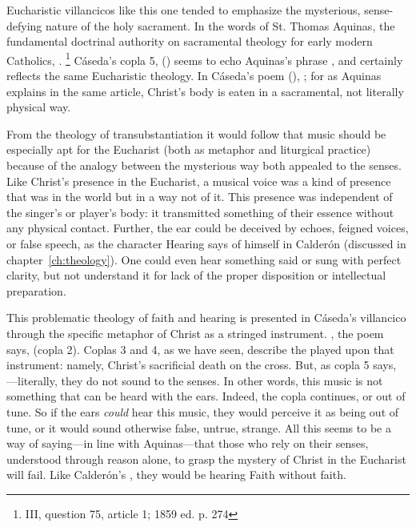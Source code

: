 Eucharistic villancicos like this one tended to emphasize the mysterious, sense-defying nature of the holy sacrament. 
In the words of St. Thomas Aquinas, the fundamental doctrinal authority on sacramental theology for early modern Catholics, .%
	\footnote{ III, question 75, article 1; 1859 ed. p. 274}
Cáseda's copla 5,  () seems to echo Aquinas's phrase , and certainly reflects the same Eucharistic theology.
In Cáseda's poem (), ; for as Aquinas explains in the same article, Christ's body is eaten in a sacramental, not literally physical way.

From the theology of transubstantiation it would follow that music should be especially apt for the Eucharist (both as metaphor and liturgical practice) because of the analogy between the mysterious way both appealed to the senses.
Like Christ's presence in the Eucharist, a musical voice was a kind of presence that was in the world but in a way not of it. 
This presence was independent of the singer's or player's body: it transmitted something of their essence without any physical contact.
Further, the ear could be deceived by echoes, feigned voices, or false speech, as the character Hearing says of himself in Calderón  (discussed in chapter~\ref{ch:theology}).
One could even hear something said or sung with perfect clarity, but not understand it for lack of the proper disposition or intellectual preparation.

This problematic theology of faith and hearing is presented in Cáseda's villancico through the specific metaphor of Christ as a stringed instrument.
, the poem says,  (copla 2).
Coplas 3 and 4, as we have seen, describe the  played upon that instrument: namely, Christ's sacrificial death on the cross.
But, as copla 5 says, ---literally, they do not sound to the senses. 
In other words, this music is not something that can be heard with the ears.
Indeed, the copla continues,  or out of tune.
So if the ears \emph{could} hear this music, they would perceive it as being out of tune, or it would sound otherwise false, untrue, strange. 
All this seems to be a way of saying---in line with Aquinas---that those who rely on their senses, understood through reason alone, to grasp the mystery of Christ in the Eucharist will fail.
Like Calderón's , they would be hearing Faith without faith.

